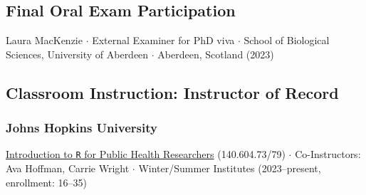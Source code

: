 \documentclass{cv}
\begin{document}





\subsection*{Final Oral Exam Participation}

Laura MacKenzie $\cdot$ External Examiner for PhD viva $\cdot$ School of Biological Sciences, University of Aberdeen $\cdot$ Aberdeen, Scotland (2023)

\subsection*{Classroom Instruction: Instructor of Record}

\subsubsection*{Johns Hopkins University}

\href{https://jhudatascience.org/intro_to_r/}{Introduction to \texttt{R} for Public Health Researchers} (140.604.73/79) $\cdot$ Co-Instructors: Ava Hoffman, Carrie Wright $\cdot$ Winter/Summer Institutes (2023--present, enrollment: 16--35)
\end{document}
